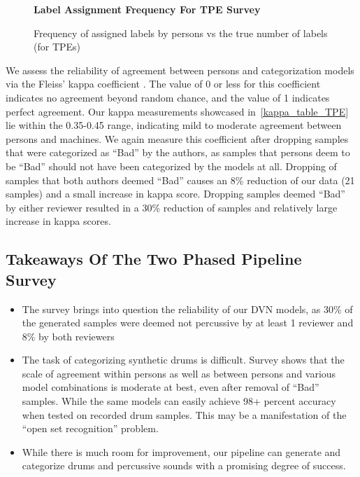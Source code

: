 \documentclass[\main/thesis.tex]{subfiles}
\begin{document}
\begin{figure}[h!]
    \begin{center}
    \textbf{Label Assignment Frequency For TPE Survey}
    \end{center}
    \caption{Frequency of assigned labels by persons vs the true number of labels (for TPEs)}
\label{fig:freq-survey-2p}
\end{figure}
We assess the reliability of agreement between persons and categorization models via the Fleiss' kappa coefficient \cite{fleiss1971measuring}. The value of 0 or less for this coefficient indicates no agreement beyond random chance, and the value of 1 indicates perfect agreement. Our kappa measurements showcased in~\ref{kappa_table_TPE} lie within the 0.35-0.45 range, indicating mild to moderate agreement between persons and machines. We again measure this coefficient after dropping samples that were categorized as \enquote{Bad} by the authors, as samples that persons deem to be \enquote{Bad} should not have been categorized by the models at all. Dropping of samples that both authors deemed \enquote{Bad} causes an 8\% reduction of our data (21 samples) and a small increase in kappa score. Dropping samples deemed \enquote{Bad} by either reviewer resulted in a 30\% reduction of samples and relatively large increase in kappa scores. 

\subsection{Takeaways Of The Two Phased Pipeline Survey}
\label{survey1_takeaway}
\begin{itemize}
    \item The survey brings into question the reliability of our DVN models, as 30\% of the generated samples were deemed not percussive by at least 1 reviewer and 8\% by both reviewers
    \item The task of categorizing synthetic drums is difficult. Survey shows that the scale of agreement within persons as well as between persons and various model combinations is moderate at best, even after removal of \enquote{Bad} samples.  While the same models can easily achieve 98+ percent accuracy when tested on recorded drum samples. This may be a manifestation of the \enquote{open set recognition} problem. 
    \item While there is much room for improvement, our pipeline can generate and categorize drums and percussive sounds with a promising degree of success. 
\end{itemize}
\end{document}
